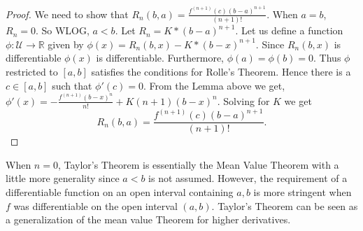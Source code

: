 \begin{proof}
    We need to show that $R_n(b,a) = \frac{f^{(n+1)}(c)(b-a)^{n+1}}{(n+1)!}$. When $a = b$, $R_n =
    0$. So WLOG, $a < b$. Let $R_n = K*(b-a)^{n+1}$. Let us define a function $\phi : \mathcal{U}
    \to \mathbb{R}$ given by  $\phi(x) = R_n(b,x) - K*(b-x)^{n+1}$. Since $R_n(b,x)$ is
    differentiable $\phi(x)$ is differentiable. Furthermore, $\phi(a) = \phi(b) = 0$. Thus $\phi$
    restricted to $\left[a,b\right]$ satisfies the conditions for Rolle's Theorem. Hence there is a
    $c \in \left[a,b\right]$ such that $\phi'(c) = 0$. From the Lemma above we get, $\phi'(x) = 
    -\frac{f^{(n+1)}(b-x)^n}{n!} + K(n+1)(b-x)^{n}$. Solving for $K$ we get 
    \begin{displaymath}
	R_n(b,a) = \frac{f^{(n+1)}(c)(b-a)^{n+1}}{(n+1)!}.
    \end{displaymath}
\end{proof}
When $n = 0$, Taylor's Theorem is essentially the Mean Value Theorem with a little more generality
since $a < b$ is not assumed. However, the requirement of a differentiable function on an open
interval containing $a,b$ is more stringent when $f$ was differentiable on the open interval
$(a,b)$. Taylor's Theorem can be seen as a generalization of the mean value Theorem for higher
derivatives.
